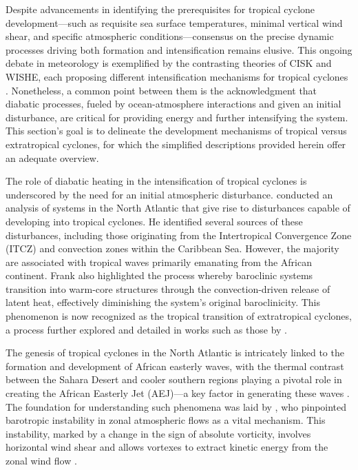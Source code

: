 Despite advancements in identifying the prerequisites for tropical cyclone development—such as requisite sea surface temperatures, minimal vertical wind shear, and specific atmospheric conditions—consensus on the precise dynamic processes driving both formation and intensification remains elusive. This ongoing debate in meteorology is exemplified by the contrasting theories of CISK and WISHE, each proposing different intensification mechanisms for tropical cyclones \citep[e.g.,]{craig1996cisk, gray1998formation, montgomery2015putting, ooyama1982conceptual,montgomery2014paradigms}. Nonetheless, a common point between them is the acknowledgment that diabatic processes, fueled by ocean-atmosphere interactions and given an initial disturbance, are critical for providing energy and further intensifying the system. This section's goal is to delineate the development mechanisms of tropical versus extratropical cyclones, for which the simplified descriptions provided herein offer an adequate overview.

The role of diabatic heating in the intensification of tropical cyclones is underscored by the need for an initial atmospheric disturbance. \citet{frank1970atlantic} conducted an analysis of systems in the North Atlantic that give rise to disturbances capable of developing into tropical cyclones. He identified several sources of these disturbances, including those originating from the Intertropical Convergence Zone (ITCZ) and convection zones within the Caribbean Sea. However, the majority are associated with tropical waves primarily emanating from the African continent. Frank also highlighted the process whereby baroclinic systems transition into warm-core structures through the convection-driven release of latent heat, effectively diminishing the system's original baroclinicity. This phenomenon is now recognized as the tropical transition of extratropical cyclones, a process further explored and detailed in works such as those by \citet{hart2003cyclone}.


The genesis of tropical cyclones in the North Atlantic is intricately linked to the formation and development of African easterly waves, with the thermal contrast between the Sahara Desert and cooler southern regions playing a pivotal role in creating the African Easterly Jet (AEJ)—a key factor in generating these waves \citep{holton1973introduction}. The foundation for understanding such phenomena was laid by \citet{kuo1949dynamic}, who pinpointed barotropic instability in zonal atmospheric flows as a vital mechanism. This instability, marked by a change in the sign of absolute vorticity, involves horizontal wind shear and allows vortexes to extract kinetic energy from the zonal wind flow \citep{holton1973introduction}.

